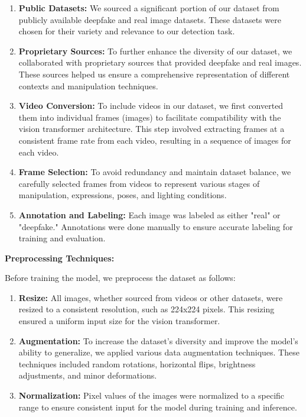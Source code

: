 \begin{enumerate}
    \item \textbf{Public Datasets:} We sourced a significant portion of our dataset from publicly available deepfake and real image datasets. These datasets were chosen for their variety and relevance to our detection task.

    \item \textbf{Proprietary Sources:} To further enhance the diversity of our dataset, we collaborated with proprietary sources that provided deepfake and real images. These sources helped us ensure a comprehensive representation of different contexts and manipulation techniques.

    \item \textbf{Video Conversion:} To include videos in our dataset, we first converted them into individual frames (images) to facilitate compatibility with the vision transformer architecture. This step involved extracting frames at a consistent frame rate from each video, resulting in a sequence of images for each video.

    \item \textbf{Frame Selection:} To avoid redundancy and maintain dataset balance, we carefully selected frames from videos to represent various stages of manipulation, expressions, poses, and lighting conditions.

    \item \textbf{Annotation and Labeling:} Each image was labeled as either "real" or "deepfake." Annotations were done manually to ensure accurate labeling for training and evaluation.
\end{enumerate}

\noindent \textbf{Preprocessing Techniques:}

\noindent Before training the model, we preprocess the dataset as follows:

\begin{enumerate}
    \item \textbf{Resize:} All images, whether sourced from videos or other datasets, were resized to a consistent resolution, such as 224x224 pixels. This resizing ensured a uniform input size for the vision transformer.

    \item \textbf{Augmentation:} To increase the dataset's diversity and improve the model's ability to generalize, we applied various data augmentation techniques. These techniques included random rotations, horizontal flips, brightness adjustments, and minor deformations.

    \item \textbf{Normalization:} Pixel values of the images were normalized to a specific range to ensure consistent input for the model during training and inference.
\end{enumerate}

